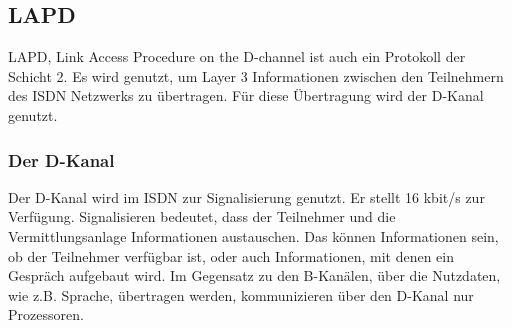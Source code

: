 \documentclass[12pt, a4paper, ngerman]{article}
\begin{document}
\subsection{LAPD}
LAPD, Link Access Procedure on the D-channel ist auch ein Protokoll der Schicht 2. Es wird genutzt, um Layer 3 Informationen zwischen den Teilnehmern des ISDN Netzwerks zu übertragen. Für diese Übertragung wird der D-Kanal genutzt.


\subsubsection{Der D-Kanal}
Der D-Kanal wird im ISDN zur Signalisierung genutzt. Er stellt 16 kbit/s zur Verfügung. Signalisieren bedeutet, dass der Teilnehmer und die Vermittlungsanlage Informationen austauschen. Das können Informationen sein, ob der Teilnehmer verfügbar ist, oder auch Informationen, mit denen ein Gespräch aufgebaut wird. Im Gegensatz zu den B-Kanälen, über die Nutzdaten, wie z.B. Sprache, übertragen werden, kommunizieren über den D-Kanal nur Prozessoren.
\end{document}

